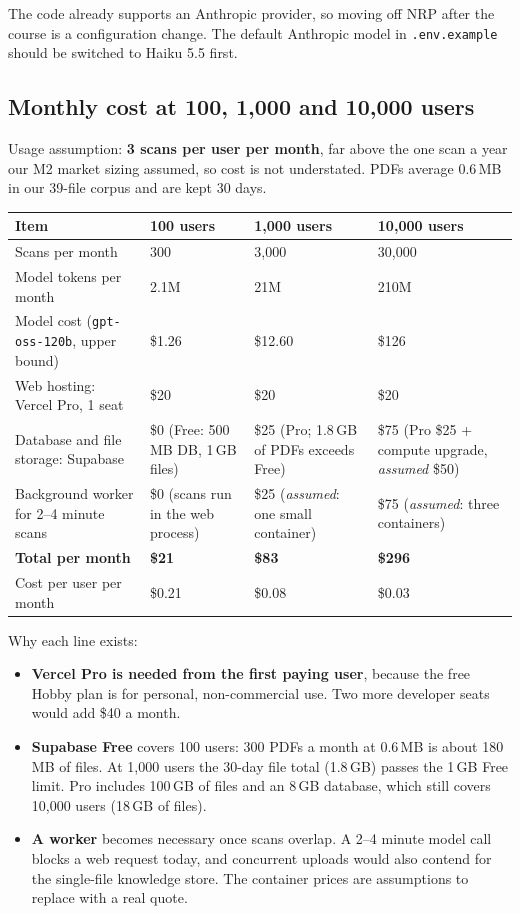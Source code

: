 \documentclass[11pt,letterpaper]{article}
\newcommand{\code}[1]{\texttt{#1}}
\begin{document}
The code already supports an Anthropic provider, so moving off NRP after the course is a configuration change. The default Anthropic model in \code{.env.example} should be switched to Haiku 5.5 first.

\subsection{Monthly cost at 100, 1,000 and 10,000 users}

Usage assumption: \textbf{3 scans per user per month}, far above the one scan a year our M2 market sizing assumed, so cost is not understated. PDFs average 0.6\,MB in our 39-file corpus and are kept 30 days.

\begin{table}[htbp]
\centering
\small
\begin{tabularx}{\textwidth}{@{}Lp{2.8cm}p{3.1cm}p{3.1cm}@{}}
\toprule
\textbf{Item} & \textbf{100 users} & \textbf{1,000 users} & \textbf{10,000 users} \\
\midrule
Scans per month & 300 & 3,000 & 30,000 \\
Model tokens per month & 2.1M & 21M & 210M \\
Model cost (\code{gpt-oss-120b}, upper bound) & \$1.26 & \$12.60 & \$126 \\
Web hosting: Vercel Pro, 1 seat \cite{vercel} & \$20 & \$20 & \$20 \\
Database and file storage: Supabase \cite{supabase} & \$0 (Free: 500\,MB DB, 1\,GB files) & \$25 (Pro; 1.8\,GB of PDFs exceeds Free) & \$75 (Pro \$25 + compute upgrade, \textit{assumed} \$50) \\
Background worker for 2--4 minute scans & \$0 (scans run in the web process) & \$25 (\textit{assumed}: one small container) & \$75 (\textit{assumed}: three containers) \\
\midrule
\textbf{Total per month} & \textbf{\$21} & \textbf{\$83} & \textbf{\$296} \\
Cost per user per month & \$0.21 & \$0.08 & \$0.03 \\
\bottomrule
\end{tabularx}
\end{table}

Why each line exists:
\begin{itemize}
  \item \textbf{Vercel Pro is needed from the first paying user}, because the free Hobby plan is for personal, non-commercial use. Two more developer seats would add \$40 a month.
  \item \textbf{Supabase Free} covers 100 users: 300 PDFs a month at 0.6\,MB is about 180\,MB of files. At 1,000 users the 30-day file total (1.8\,GB) passes the 1\,GB Free limit. Pro includes 100\,GB of files and an 8\,GB database, which still covers 10,000 users (18\,GB of files).
  \item \textbf{A worker} becomes necessary once scans overlap. A 2--4 minute model call blocks a web request today, and concurrent uploads would also contend for the single-file knowledge store. The container prices are assumptions to replace with a real quote.
\end{itemize}
\end{document}
